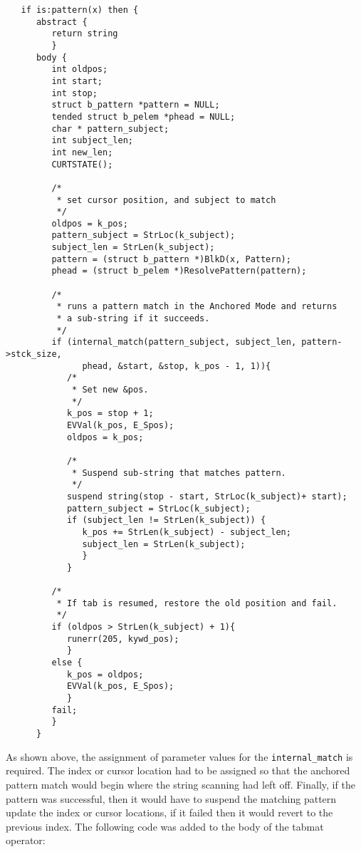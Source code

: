 \documentclass{article}
\begin{document}
\begin{verbatim}
   if is:pattern(x) then {
      abstract {
         return string
         }
      body {
         int oldpos;
         int start;
         int stop;
         struct b_pattern *pattern = NULL;
         tended struct b_pelem *phead = NULL; 
         char * pattern_subject;
         int subject_len;
         int new_len;
         CURTSTATE();
         
         /*
          * set cursor position, and subject to match
          */
         oldpos = k_pos;
         pattern_subject = StrLoc(k_subject);
         subject_len = StrLen(k_subject);
         pattern = (struct b_pattern *)BlkD(x, Pattern);
         phead = (struct b_pelem *)ResolvePattern(pattern);
         
         /*
          * runs a pattern match in the Anchored Mode and returns
          * a sub-string if it succeeds.
          */
         if (internal_match(pattern_subject, subject_len, pattern->stck_size,
               phead, &start, &stop, k_pos - 1, 1)){
            /*
             * Set new &pos.
             */ 
            k_pos = stop + 1;
            EVVal(k_pos, E_Spos);	
            oldpos = k_pos;
         
            /*
             * Suspend sub-string that matches pattern.
             */
            suspend string(stop - start, StrLoc(k_subject)+ start);
            pattern_subject = StrLoc(k_subject);
            if (subject_len != StrLen(k_subject)) {
               k_pos += StrLen(k_subject) - subject_len;
               subject_len = StrLen(k_subject);
               }
            }
            
         /*
          * If tab is resumed, restore the old position and fail.
          */
         if (oldpos > StrLen(k_subject) + 1){
            runerr(205, kywd_pos);
            } 
         else {
            k_pos = oldpos;
            EVVal(k_pos, E_Spos);
            }
         fail;
         }
      }
\end{verbatim}

As shown above, the assignment of parameter values for the \texttt{internal\_match} is required. The index or cursor location had to be assigned so that the anchored pattern match would begin where the string scanning had left off.  Finally, if the pattern was successful, then it would have to suspend the matching pattern update the index or cursor locations, if it failed then it would revert to the previous index.  The following code was added to the body of the tabmat operator:
\end{document}
